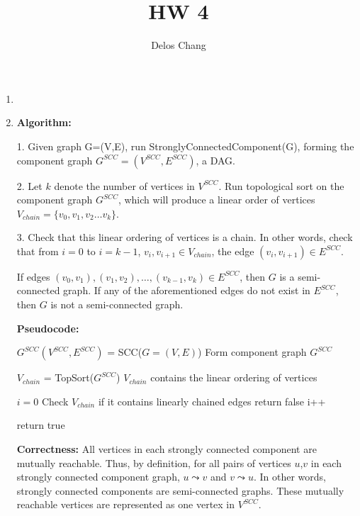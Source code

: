 \documentclass[a4paper]{report}
\title{HW 4}
\author{Delos Chang}
\date{}
\begin{document}
  \begin{enumerate}
    \item 


    \par
    \bigskip

    \item 
      {\bf Algorithm:}

      1. Given graph G=(V,E), run StronglyConnectedComponent(G), forming the component graph $G^{SCC} = (V^{SCC}, E^{SCC})$, a DAG.

      2. Let $k$ denote the number of vertices in $V^{SCC}$. Run topological sort on the component graph $G^{SCC}$, 
      which will produce a linear order of vertices $V_{chain} = \{v_{0}, v_{1}, v_{2} \dots v_{k}\}$.

      3. Check that this linear ordering of vertices is a chain. 
      In other words, check that from $i=0$ to $i=k-1$, $v_{i},v_{i+1} \in V_{chain}$, the edge $(v_{i},v_{i+1}) \in E^{SCC}$.

      If edges $(v_{0}, v_{1}), (v_{1},v_{2}),\dots,(v_{k-1},v_{k}) \in E^{SCC}$, then $G$ is a semi-connected graph.
      If any of the aforementioned edges do not exist in $E^{SCC}$, then $G$ is not a semi-connected graph. 

      {\bf Pseudocode:}

      \begin{algorithmic}[1]

        \State $G^{SCC}(V^{SCC},E^{SCC})$ = SCC($G=(V,E)$)
        \Comment Form component graph $G^{SCC}$

        \State $V_{chain}$ = TopSort($G^{SCC}$)
        \Comment $V_{chain}$ contains the linear ordering of vertices

        \State $i=0$
        \Comment Check $V_{chain}$ if it contains linearly chained edges
            \State return false
          \EndIf
          \State i++

        \EndWhile
        \State return true
      \EndFunction
    \end{algorithmic}

      {\bf Correctness:}
      All vertices in each strongly connected component are mutually reachable. 
      Thus, by definition, for all pairs of vertices $u$,$v$ in each strongly connected component graph, $u \leadsto v$ and $v \leadsto u$. 
      In other words, strongly connected components are semi-connected graphs. 
      These mutually reachable vertices are represented as one vertex in $V^{SCC}$. 


\end{enumerate}
\end{document}

